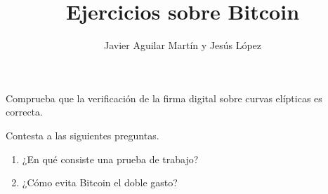 \documentclass[twoside]{article}
\begin{document}
\title{Ejercicios sobre Bitcoin}
\author{Javier Aguilar Martín y Jesús López}
\maketitle


\begin{ejercicio}{1}
Comprueba que la verificación de la firma digital sobre curvas elípticas es correcta. 

\end{ejercicio}


\begin{ejercicio}{2}
	Contesta a las siguientes preguntas.
	\begin{enumerate}
		\item ¿En qué consiste una prueba de trabajo?
	\item  ¿Cómo evita Bitcoin el doble gasto?
\end{enumerate}
\end{ejercicio}
\end{document}
